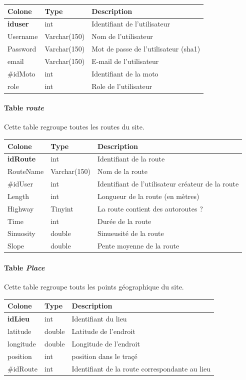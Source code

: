 \documentclass[a4paper]{article}
\begin{document}
\begin{tabular}{|l|l|l|}
	\hline
	Colone          & Type         & Description                  \\ \hline\hline
	\textbf{iduser} & int & Identifiant de l'utilisateur \\ \hline
	Username & Varchar(150) & Nom de l'utilisateur \\ \hline
	Password & Varchar(150) & Mot de passe de l'utilisateur (sha1) \\ \hline
	email & Varchar(150) & E-mail de l'utilisateur \\ \hline
	\#idMoto & int & Identifiant de la moto \\ \hline
	role & int & Role de l'utilisateur \\ \hline
\end{tabular}

\paragraph{Table \emph{route}}
Cette table regroupe toutes les routes du site.

\begin{tabular}{|l|l|l|}
	\hline
	Colone          & Type         & Description                  \\ \hline\hline
	\textbf{idRoute}& int & Identifiant de la route \\ \hline
	RouteName & Varchar(150) & Nom de la route \\ \hline
	\#idUser & int & Identifiant de l'utilisateur créateur de la route \\ \hline
	Length & int & Longueur de la route (en mètres) \\ \hline
	Highway & Tinyint & La route contient des autoroutes ? \\ \hline
	Time & int & Durée de la route \\ \hline
	Sinuosity & double & Sinueusité de la route \\ \hline
	Slope & double & Pente moyenne de la route \\ \hline
\end{tabular}

\paragraph{Table \emph{Place}}
Cette table regroupe touts les points géographique du site.

\begin{tabular}{|l|l|l|}
	\hline
	Colone          & Type         & Description                  \\ \hline\hline
	\textbf{idLieu} & int & Identifiant du lieu \\ \hline
	latitude & double & Latitude de l'endroit \\ \hline
	longitude & double & Longitude de l'endroit \\ \hline
	position & int& position dans le traçé \\ \hline
	\#idRoute & int & Identifiant de la route correspondante au lieu \\ \hline
\end{tabular}
\pagebreak
\end{document}
